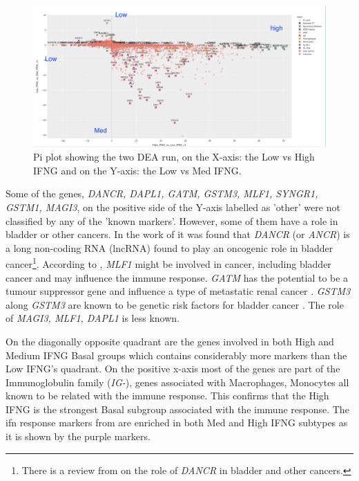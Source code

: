 \begin{figure}[!htb]    
    \centering
    \includegraphics[width=1.0\textwidth,keepaspectratio]{Sections/ClusteringAnalysis/Resources/discussion/low_basal.png}
    \caption{Pi plot showing the two DEA run, on the X-axis: the Low vs High IFNG and on the Y-axis: the Low vs Med IFNG. }
    \label{fig:cs:pi_basal}
\end{figure}

Some of the genes, \textit{DANCR, DAPL1, GATM, GSTM3, MLF1, SYNGR1, GSTM1, MAGI3}, on the positive side of the Y-axis labelled as 'other' were not classified by any of the 'known markers'. However, some of them have a role in bladder or other cancers. In the work of \citet{Zhan2018-um} it was found that \textit{DANCR} (or \textit{ANCR}) is a long non-coding RNA (lncRNA) found to play an oncogenic role in bladder cancer\footnote{There is a review from \citet{Wang2021-gn} on the role of \textit{DANCR} in bladder and other cancers.}. According to \citet{Li2023-mk}, \textit{MLF1} might be involved in cancer, including bladder cancer and may influence the immune response. \textit{GATM} has the potential to be a tumour suppressor gene and influence a type of metastatic renal cancer \citet{Jee2022-wi}. \textit{GSTM3} along \textit{GSTM3} are known to be genetic risk factors for bladder cancer \citet{Schnakenberg2000-cu}. The role of \textit{MAGI3, MLF1, DAPL1} is less known.

On the diagonally opposite quadrant are the genes involved in both High and Medium IFNG Basal groups which contains considerably more markers than the Low IFNG's quadrant. On the positive x-axis  most of the genes are part of the Immunoglobulin family (\textit{IG-}), genes associated with Macrophages, Monocytes all known to be related with the immune response. This confirms that the High IFNG is the strongest Basal subgroup associated with the immune response. The \acrshort{ifn} response markers from \citet{Baker2022-bj} are enriched in both Med and High IFNG subtypes as it is shown by the purple markers.


